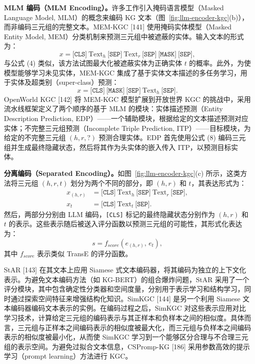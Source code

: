 \documentclass[11pt,UTF8,fontset=fandol]{ctexart}
\begin{document}
\textbf{MLM 编码（MLM Encoding）。}许多工作引入掩码语言模型（Masked Language Model, MLM）的概念来编码 KG 文本（图~\ref{fig:llm-encoder-kgc}(b)），而非编码三元组的完整文本。MEM-KGC [141] 使用掩码实体模型（Masked Entity Model, MEM）分类机制来预测三元组中被遮蔽的实体。输入文本的形式为：
\begin{equation}
x = \texttt{[CLS]}\ \text{Text}_h\ \texttt{[SEP]}\ \text{Text}_r\ \texttt{[SEP]}\ \texttt{[MASK]}\ \texttt{[SEP]}, \tag{7}
\end{equation}
与公式 (4) 类似，该方法试图最大化被遮蔽实体为正确实体 $t$ 的概率。此外，为使模型能够学习未见实体，MEM-KGC 集成了基于实体文本描述的多任务学习，用于实体及超类别（super-class）预测：
\begin{equation}
x = \texttt{[CLS]}\ \texttt{[MASK]}\ \texttt{[SEP]}\ \text{Text}_h\ \texttt{[SEP]}. \tag{8}
\end{equation}
OpenWorld KGC [142] 将 MEM-KGC 模型扩展到开放世界 KGC 的挑战中，采用流水线框架定义了两个顺序的基于 MLM 的模块：实体描述预测（Entity Description Prediction, EDP）——一个辅助模块，根据给定的文本描述预测对应实体；不完整三元组预测（Incomplete Triple Prediction, ITP）——目标模块，为给定的不完整三元组 $(h, r, ?)$ 预测合理实体。EDP 首先使用公式 (8) 编码三元组并生成最终隐藏状态，然后将其作为头实体的嵌入传入 ITP，以预测目标实体。

\textbf{分离编码（Separated Encoding）。}如图~\ref{fig:llm-encoder-kgc}(c) 所示，这类方法将三元组 $(h, r, t)$ 划分为两个不同的部分，即 $(h, r)$ 和 $t$，其表达形式为：
\begin{align}
x_{(h,r)} &= \texttt{[CLS]}\ \text{Text}_h\ \texttt{[SEP]}\ \text{Text}_r\ \texttt{[SEP]}, \tag{9} \\
x_t &= \texttt{[CLS]}\ \text{Text}_t\ \texttt{[SEP]}. \tag{10}
\end{align}
然后，两部分分别由 LLM 编码，\texttt{[CLS]} 标记的最终隐藏状态分别作为 $(h, r)$ 和 $t$ 的表示。这些表示随后被送入评分函数以预测三元组的可能性，其形式化表达为：
\begin{equation}
s = f_{score}(e_{(h,r)},\, e_t), \tag{11}
\end{equation}
其中 $f_{score}$ 表示类似 TransE 的评分函数。

StAR [143] 在其文本上应用 Siamese 式文本编码器，将其编码为独立的上下文化表示。为避免文本编码方法（如 KG-BERT）的组合爆炸问题，StAR 采用了一个评分模块，其中包含确定性分类器和空间度量，分别用于表示学习和结构学习，同时通过探索空间特征来增强结构化知识。SimKGC [144] 是另一个利用 Siamese 文本编码器编码文本表示的实例。在编码过程之后，SimKGC 对这些表示应用对比学习技术，计算给定三元组的编码表示与其正样本和负样本之间的相似度。具体而言，三元组与正样本之间编码表示的相似度被最大化，而三元组与负样本之间编码表示的相似度被最小化，从而使 SimKGC 学习到一个能够区分合理与不合理三元组的表示空间。为避免过拟合文本信息，CSPromp-KG [186] 采用参数高效的提示学习（prompt learning）方法进行 KGC。
\end{document}
